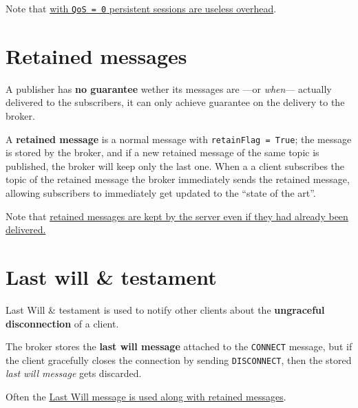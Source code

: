 Note that \ul{with \texttt{QoS = 0} persistent sessions are useless overhead}.

\section{Retained messages}
A publisher has \textbf{no guarantee} wether its messages are ---or \textit{when}---
actually delivered to the subscribers,
it can only achieve guarantee on the delivery to the broker.

A \textbf{retained message} is a normal message with
\texttt{retainFlag = True}; the message is stored by the broker, and if a new retained message of the same topic is published, the broker will keep only the last one.
When a a client subscribes the topic of the retained
message  the broker immediately sends the retained message,
allowing subscribers to immediately get updated to the ``state of the art''.

Note that \ul{retained messages are kept by the server even if they had already been delivered.}

\section{Last will \& testament}
Last Will \& testament is used to notify other clients about the \textbf{ungraceful disconnection} of a client.

The broker stores the \textbf{last will message} attached to the \texttt{CONNECT} message, but if the client gracefully closes the connection by sending \texttt{DISCONNECT}, then the stored \textit{last will message} gets discarded.

Often the \ul{Last Will message is used along with retained messages}.

